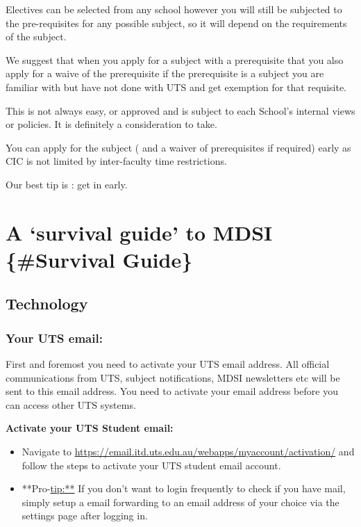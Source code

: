 \documentclass[]{book}
\providecommand{\tightlist}{%
  \setlength{\itemsep}{0pt}\setlength{\parskip}{0pt}}
\theoremstyle{definition}
\theoremstyle{definition}
\theoremstyle{remark}
\begin{document}
Electives can be selected from any school however you will still be
subjected to the pre-requisites for any possible subject, so it will
depend on the requirements of the subject.

We suggest that when you apply for a subject with a prerequisite that
you also apply for a waive of the prerequisite if the prerequisite is a
subject you are familiar with but have not done with UTS and get
exemption for that requisite.

This is not always easy, or approved and is subject to each School's
internal views or policies. It is definitely a consideration to take.

You can apply for the subject ( and a waiver of prerequisites if
required) early as CIC is not limited by inter-faculty time
restrictions.

Our best tip is : get in early.

\chapter{\texorpdfstring{A `survival guide' to MDSI \{\#Survival
Guide\}}{A survival guide to MDSI \{\#Survival Guide\}}}\label{a-survival-guide-to-mdsi-survival-guide}

\section{Technology}\label{technology}

\subsection{Your UTS email:}\label{your-uts-email}

First and foremost you need to activate your UTS email address. All
official communications from UTS, subject notifications, MDSI
newsletters etc will be sent to this email address. You need to activate
your email address before you can access other UTS systems.

\textbf{Activate your UTS Student email:}

\begin{itemize}
\tightlist
\item
  Navigate to
  \url{https://email.itd.uts.edu.au/webapps/myaccount/activation/} and
  follow the steps to activate your UTS student email account.
\item
  **Pro-\url{tip:**} If you don't want to login frequently to check if
  you have mail, simply setup a email forwarding to an email address of
  your choice via the settings page after logging in.
\end{itemize}
\end{document}
